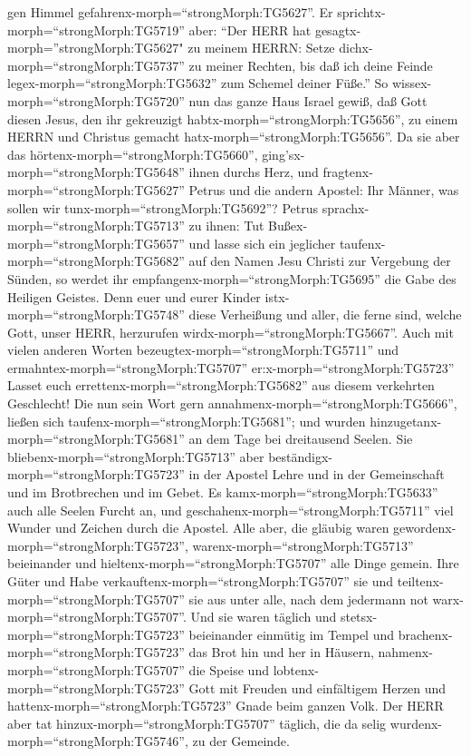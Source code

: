 gen Himmel gefahrenx-morph=``strongMorph:TG5627''. Er
sprichtx-morph=``strongMorph:TG5719'' aber: ``Der HERR hat
gesagtx-morph=''strongMorph:TG5627" zu meinem HERRN: Setze
dichx-morph=``strongMorph:TG5737'' zu meiner Rechten,  bis
daß ich deine Feinde legex-morph=``strongMorph:TG5632'' zum Schemel
deiner Füße.''  So wissex-morph=``strongMorph:TG5720'' nun
das ganze Haus Israel gewiß, daß Gott diesen Jesus, den ihr gekreuzigt
habtx-morph=``strongMorph:TG5656'', zu einem HERRN und Christus gemacht
hatx-morph=``strongMorph:TG5656''.  Da sie aber das
hörtenx-morph=``strongMorph:TG5660'',
ging'sx-morph=``strongMorph:TG5648'' ihnen durchs Herz, und
fragtenx-morph=``strongMorph:TG5627'' Petrus und die andern Apostel: Ihr
Männer, was sollen wir tunx-morph=``strongMorph:TG5692''? 
Petrus sprachx-morph=``strongMorph:TG5713'' zu ihnen: Tut
Bußex-morph=``strongMorph:TG5657'' und lasse sich ein jeglicher
taufenx-morph=``strongMorph:TG5682'' auf den Namen Jesu Christi zur
Vergebung der Sünden, so werdet ihr
empfangenx-morph=``strongMorph:TG5695'' die Gabe des Heiligen Geistes.
 Denn euer und eurer Kinder
istx-morph=``strongMorph:TG5748'' diese Verheißung und aller, die ferne
sind, welche Gott, unser HERR, herzurufen
wirdx-morph=``strongMorph:TG5667''.  Auch mit vielen
anderen Worten bezeugtex-morph=``strongMorph:TG5711'' und
ermahntex-morph=``strongMorph:TG5707'' er:x-morph=``strongMorph:TG5723''
Lasset euch errettenx-morph=``strongMorph:TG5682'' aus diesem verkehrten
Geschlecht!  Die nun sein Wort gern
annahmenx-morph=``strongMorph:TG5666'', ließen sich
taufenx-morph=``strongMorph:TG5681''; und wurden
hinzugetanx-morph=``strongMorph:TG5681'' an dem Tage bei dreitausend
Seelen.  Sie bliebenx-morph=``strongMorph:TG5713'' aber
beständigx-morph=``strongMorph:TG5723'' in der Apostel Lehre und in der
Gemeinschaft und im Brotbrechen und im Gebet.  Es
kamx-morph=``strongMorph:TG5633'' auch alle Seelen Furcht an, und
geschahenx-morph=``strongMorph:TG5711'' viel Wunder und Zeichen durch
die Apostel.  Alle aber, die gläubig waren
gewordenx-morph=``strongMorph:TG5723'',
warenx-morph=``strongMorph:TG5713'' beieinander und
hieltenx-morph=``strongMorph:TG5707'' alle Dinge gemein. 
Ihre Güter und Habe verkauftenx-morph=``strongMorph:TG5707'' sie und
teiltenx-morph=``strongMorph:TG5707'' sie aus unter alle, nach dem
jedermann not warx-morph=``strongMorph:TG5707''.  Und sie
waren täglich und stetsx-morph=``strongMorph:TG5723'' beieinander
einmütig im Tempel und brachenx-morph=``strongMorph:TG5723'' das Brot
hin und her in Häusern, 
nahmenx-morph=``strongMorph:TG5707'' die Speise und
lobtenx-morph=``strongMorph:TG5723'' Gott mit Freuden und einfältigem
Herzen und hattenx-morph=``strongMorph:TG5723'' Gnade beim ganzen Volk.
Der HERR aber tat hinzux-morph=``strongMorph:TG5707'' täglich, die da
selig wurdenx-morph=``strongMorph:TG5746'', zu der Gemeinde.


